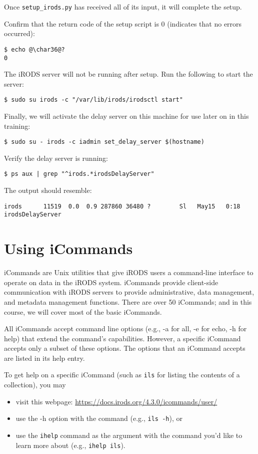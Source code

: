 \documentclass[10pt,oneside]{memoir}
\begin{document}
Once \texttt{setup\_irods.py} has received all of its input, it will complete the setup.

Confirm that the return code of the setup script is 0 (indicates that no errors occurred):
\begin{lstlisting}
$ echo @\char36@?
0
\end{lstlisting}

The iRODS server will not be running after setup. Run the following to start the server:
\begin{lstlisting}
$ sudo su irods -c "/var/lib/irods/irodsctl start"
\end{lstlisting}

Finally, we will activate the delay server on this machine for use later on in this training:
\begin{lstlisting}
$ sudo su - irods -c iadmin set_delay_server $(hostname)
\end{lstlisting}

Verify the delay server is running:
\begin{lstlisting}
$ ps aux | grep "^irods.*irodsDelayServer"
\end{lstlisting}

The output should resemble:
\begin{lstlisting}
irods      11519  0.0  0.9 287860 36480 ?        Sl   May15   0:18 irodsDelayServer
\end{lstlisting}

\chapter{Using iCommands}

iCommands are Unix utilities that give iRODS users a command-line interface to operate on data in the iRODS system. iCommands provide client-side communication with iRODS servers to provide administrative, data management, and metadata management functions. There are over 50 iCommands; and in this course, we will cover most of the basic iCommands.

All iCommands accept command line options (e.g., -a for all, -e for echo, -h for help) that extend the command's capabilities. However, a specific iCommand accepts only a subset of these options. The options that an iCommand accepts are listed in its help entry.

To get help on a specific iCommand (such as \texttt{ils} for listing the contents of a collection), you may
\begin{itemize}
 \item visit this webpage: \url{https://docs.irods.org/4.3.0/icommands/user/}
 \item use the -h option with the command (e.g., \texttt{ils -h}), or
 \item use the \texttt{ihelp} command as the argument with the command you'd like to learn more
         about (e.g., \texttt{ihelp ils}).
\end{itemize}
\end{document}
